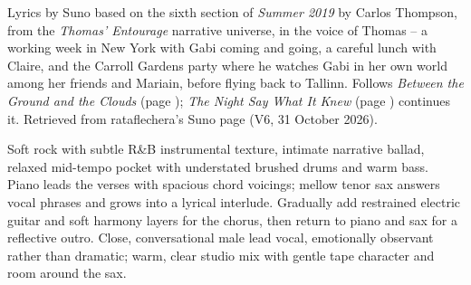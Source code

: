 
\label{sec:make-a-room-your-own}
\begin{notes}
Lyrics by Suno based on the sixth section of \emph{Summer 2019} by Carlos Thompson, from the \emph{Thomas' Entourage} narrative universe, in the voice of Thomas -- a working week in New York with Gabi coming and going, a careful lunch with Claire, and the Carroll Gardens party where he watches Gabi in her own world among her friends and Mariain, before flying back to Tallinn. Follows \emph{Between the Ground and the Clouds} (page \pageref{sec:between-the-ground-and-the-clouds}); \emph{The Night Say What It Knew} (page \pageref{sec:the-night-say-what-it-knew}) continues it. Retrieved from rataflechera's Suno page (V6, 31 October 2026).
\end{notes}
\begin{style}
Soft rock with subtle R\&B instrumental texture, intimate narrative ballad, relaxed mid-tempo pocket with understated brushed drums and warm bass. Piano leads the verses with spacious chord voicings; mellow tenor sax answers vocal phrases and grows into a lyrical interlude. Gradually add restrained electric guitar and soft harmony layers for the chorus, then return to piano and sax for a reflective outro. Close, conversational male lead vocal, emotionally observant rather than dramatic; warm, clear studio mix with gentle tape character and room around the sax.
\end{style}

